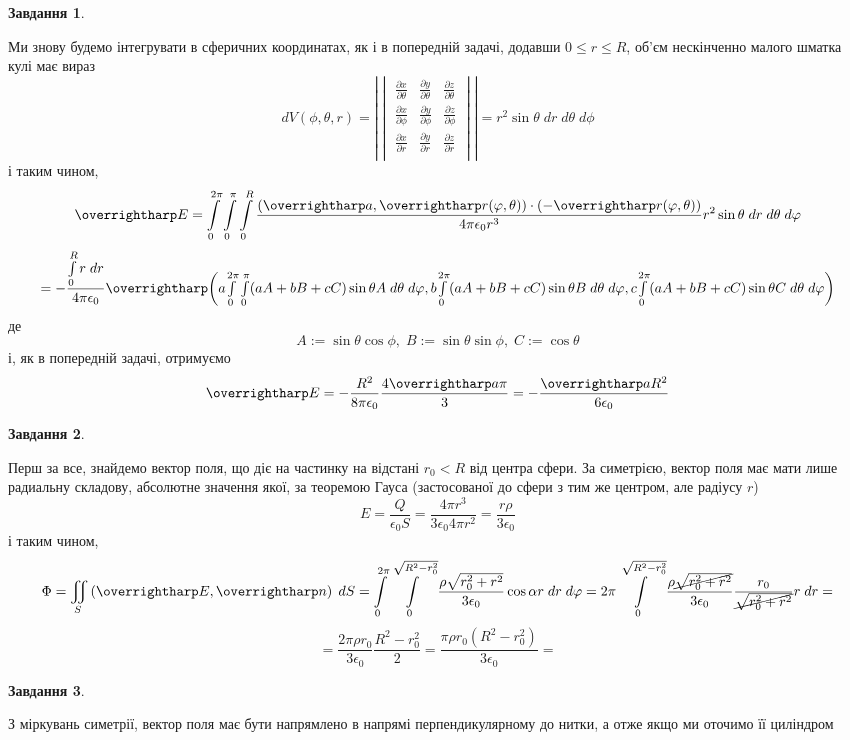 \documentclass[12pt]{article} %
\newtheorem{prob}{Завдання}
\begin{document}
\begin{prob}\end{prob}%
	Ми знову будемо інтегрувати в сферичних координатах, як і в попередній задачі, додавши $0\leq r\leq R$, об’єм нескінченно малого 
	шматка кулі має вираз
	\[dV(\phi,\theta,r)=|\begin{vmatrix}
		\frac{\partial x}{\partial\theta}&\frac{\partial y}{\partial\theta}&\frac{\partial z}{\partial\theta}\\
		\frac{\partial x}{\partial\phi}&\frac{\partial y}{\partial\phi}&\frac{\partial z}{\partial\phi}\\
		\frac{\partial x}{\partial r}&\frac{\partial y}{\partial r}&\frac{\partial z}{\partial r}\\
	\end{vmatrix}|=r^2\sin\theta\;dr\;d\theta\;d\phi\]
	\renewcommand{\myint}[1]{\int_0^{2\pi}\int_0^\pi\int_0^R#1\;dr\;d\theta\;d\phi}
	і таким чином,
	\[\myvec{E}=\myint{\frac{(\myvec{a},\myvec{r}(\phi,\theta))\cdot(-\myvec{r}(\phi,\theta))}{4\pi\epsilon_0r^3}r^2\sin\theta}\]
	\renewcommand{\myint}[1]{\int_0^{2\pi}\int_0^\pi#1\;d\theta\;d\phi}
	\[=-\frac{\int_0^Rr\;dr}{4\pi\epsilon_0}\myvec{\mybra{
	a{\int_0^{2\pi}\int_0^\pi(aA+bB+cC)\sin\theta A \;d\theta\;d\phi},
	b{\int_0^{2\pi}(aA+bB+cC)\sin\theta B\;d\theta\;d\phi},
	c{\int_0^{2\pi}(aA+bB+cC)\sin\theta C \;d\theta\;d\phi}
	}}\]
	де
	\[A:=\sin\theta\cos\phi,\;B:=\sin\theta\sin\phi,\;C:=\cos\theta\]
	і, як в попередній задачі, отримуємо
	\[\myvec{E}=-\frac{R^2}{8\pi\epsilon_0}\frac{4\myvec{a}\pi}{3}=-\frac{\myvec{a}R^2}{6\epsilon_0}\]
\begin{prob}\end{prob}%
	Перш за все, знайдемо вектор поля, що діє на частинку на відстані $r_0<R$ від центра сфери. За симетрією, вектор поля має мати лише
	радиальну складову, абсолютне значення якої, за теоремою Гауса (застосованої до сфери з тим же центром, але радіусу $r$)
	\[E=\frac{Q}{\epsilon_0 S}=\frac{4\pi r^3}{3\epsilon_0 4\pi r^2}=\frac{r\rho}{3\epsilon_0}\]
	і таким чином,
	\[\Phi=\iint_S\mybra{\myvec{E},\myvec{n}}\;dS=\int_0^{2\pi}\int_0^{\sqrt{R^2-r_0^2}}\frac{\rho\sqrt{r_0^2+r^2}}{3\epsilon_0}\cos\alpha
	r\;dr\;d\phi=2\pi\int_0^{\sqrt{R^2-r_0^2}}\frac{\rho\cancel{\sqrt{r_0^2+r^2}}}{3\epsilon_0}\frac{r_0}{\cancel{\sqrt{r_0^2+r^2}}}r\;dr=\]
	\[=\frac{2\pi\rho r_0}{3\epsilon_0}\frac{R^2-r_0^2}{2}=\frac{\pi\rho r_0(R^2-r_0^2)}{3\epsilon_0}=\]
\begin{prob}\end{prob}%
	З міркувань симетрії, вектор поля має бути напрямлено в напрямі перпендикулярному до нитки, а отже якщо ми оточимо її циліндром
\end{document}
